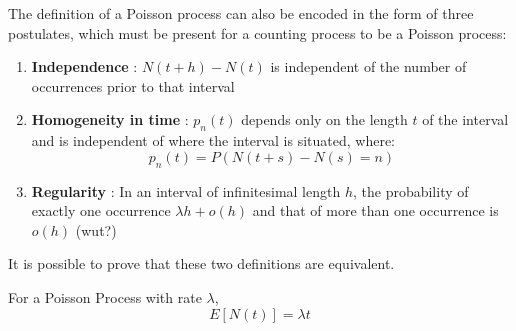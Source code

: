\documentclass[12pt,letterpaper]{amsbook}
\theoremstyle{definition}
\begin{document}
The definition of a Poisson process can also be encoded in the form of three postulates, which must be present for a counting process to be a Poisson process:

\begin{enumerate}
  \item \textbf{Independence} : $N(t+h) - N(t)$ is independent of the number of occurrences prior to that interval
  \item \textbf{Homogeneity in time} : $p_n(t)$ depends only on the length $t$ of the interval and is independent of where the interval is situated, where:
    \[p_n(t) = P(N(t+s) - N(s) = n)\]
  \item \textbf{Regularity} : In an interval of infinitesimal length $h$, the probability of exactly one occurrence $\lambda h + o(h)$ and that of more than one occurrence is $o(h)$ (wut?)
\end{enumerate}

It is possible to prove that these two definitions are equivalent.

\begin{lemma}
  For a Poisson Process with rate $\lambda$,
  \[E[N(t)] = \lambda t\]
\end{lemma}
\end{document}
